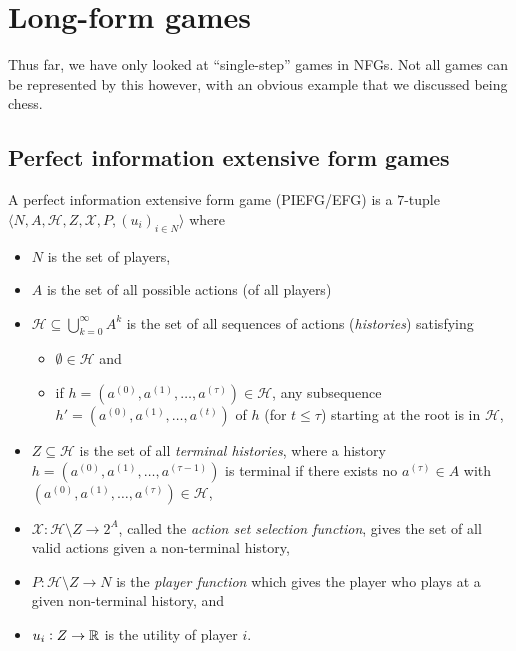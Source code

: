 \section{Long-form games}

Thus far, we have only looked at ``single-step'' games in NFGs. Not all games can be represented by this however, with an obvious example that we discussed being chess.

\subsection{Perfect information extensive form games}

	\begin{fdef}
		A perfect information extensive form game (PIEFG/EFG) is a $7$-tuple $\langle N,A,\mathcal{H},Z,\mathcal{X},P,(u_i)_{i\in N}\rangle$ where
		\begin{itemize}
			\item $N$ is the set of players,
			\item $A$ is the set of all possible actions (of all players)
			\item $\mathcal{H} \subseteq \bigcup_{k=0}^{\infty} A^k$ is the set of all sequences of actions (\emph{histories}) satisfying
			\begin{itemize}
				\item $\emptyset \in \mathcal{H}$ and
				\item if $h = (a^{(0)},a^{(1)},\ldots,a^{(\tau)}) \in \mathcal{H}$, any subsequence $h' = (a^{(0)},a^{(1)},\ldots,a^{(t)})$ of $h$ (for $t \le \tau$) starting at the root is in $\mathcal{H}$,
			\end{itemize}
			\item $Z \subseteq \mathcal{H}$ is the set of all \emph{terminal histories}, where a history $h = (a^{(0)},a^{(1)},\ldots,a^{(\tau-1)})$ is terminal if there exists no $a^{(\tau)} \in A$ with $(a^{(0)},a^{(1)},\ldots,a^{(\tau)}) \in \mathcal{H}$,
			\item $\mathcal{X} : \mathcal{H} \setminus Z \to 2^A$, called the \emph{action set selection function}, gives the set of all valid actions given a non-terminal history,
			\item $P : \mathcal{H}\setminus Z \to N$ is the \emph{player function} which gives the player who plays at a given non-terminal history, and
			\item $u_i : Z \to \mathbb{R}$ is the utility of player $i$.
		\end{itemize}
	\end{fdef}

